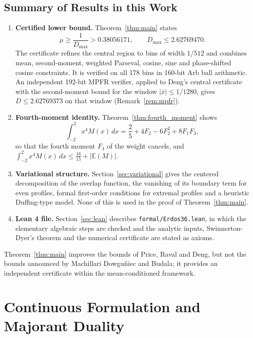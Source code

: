 \documentclass[11pt,a4paper]{article}
\theoremstyle{definition}
\theoremstyle{remark}
\newcommand{\E}{\mathbb{E}}
\begin{document}
\subsection{Summary of Results in this Work}

\begin{enumerate}
\item \textbf{Certified lower bound.} Theorem~\ref{thm:main} states
\begin{equation}
\mu \ge \frac{1}{D_{\max}} > 0.38056171, \qquad D_{\max} \le 2.62769470.
\end{equation}
The certificate refines the central region to bins of width $1/512$ and combines mean, second-moment, weighted Parseval, cosine, sine and phase-shifted cosine constraints. It is verified on all 178 bins in 160-bit Arb ball arithmetic. An independent 192-bit MPFR verifier, applied to Deng's central certificate with the second-moment bound for the window $|\bar{x}| \le 1/1280$, gives $D \le 2.62769373$ on that window (Remark~\ref{rem:mpfr}).
\item \textbf{Fourth-moment identity.} Theorem~\ref{thm:fourth_moment} shows
\begin{equation}
\int_{-2}^2 x^4 M(x) \, dx = \frac{2}{5} + 4F_2 - 6F_2^2 + 8F_1F_3,
\end{equation}
so that the fourth moment $F_4$ of the weight cancels, and $\int_{-2}^2 x^4 M(x) \, dx \le \frac{16}{15} + |\E(M)|$.
\item \textbf{Variational structure.} Section~\ref{sec:variational} gives the centered decomposition of the overlap function, the vanishing of its boundary term for even profiles, formal first-order conditions for extremal profiles and a heuristic Duffing-type model. None of this is used in the proof of Theorem~\ref{thm:main}.
\item \textbf{Lean 4 file.} Section~\ref{sec:lean} describes \nolinkurl{formal/Erdos36.lean}, in which the elementary algebraic steps are checked and the analytic inputs, Swinnerton-Dyer's theorem and the numerical certificate are stated as axioms.
\end{enumerate}
Theorem~\ref{thm:main} improves the bounds of Price, Raval and Deng, but not the bounds announced by Machillari Dowgu\~{n}iec and Budala; it provides an independent certificate within the mean-conditioned framework.

\section{Continuous Formulation and Majorant Duality}
\label{sec:continuous}
\end{document}
